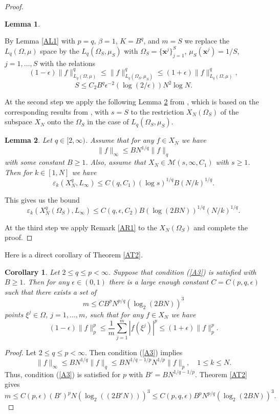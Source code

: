 \documentclass[12pt]{article}
\def \cM{\mathcal M}
\def \ep{\epsilon}
\def \e{\varepsilon}
\def\bx{\mathbf x}
\newtheorem{Lemma}{Lemma}[section]
\newtheorem{Corollary}{Corollary}[section]
\numberwithin{equation}{section}
\newcommand{\be}{\begin{equation}}
\newcommand{\ee}{\end{equation}}
\begin{document}
\begin{proof}
\begin{Lemma}
\end{Lemma}

By Lemma \ref{AL1} with $p=q$, $\beta =1$, $K=B^q$, and $m=S$ we replace the $L_q(\Omega,\mu)$ space 
by the $L_q(\Omega_S,\mu_S)$ with $\Omega_S= \{\bx^j\}_{j=1}^S$, $\mu_S(\bx^j)=1/S$, $j=1,\dots, S$ with the relations
\be\label{A6}
(1-\ep)\|f\|_{L_q(\Omega,\mu)}^q \le \|f\|_{L_q(\Omega_S,\mu_S)}^q \le (1+\ep)\|f\|_{L_q(\Omega,\mu)}^q,
\ee
\be\label{A7}
 S\le C_2B^q \ep^{-2}( \log( 2/\ep)) N^{2}\log N.
\ee

At the second step we apply the following Lemma \ref{AL2} from \cite{VT180}, which is based on the corresponding results from \cite{Kos}, with $s=S$ to the restriction $X_N(\Omega_S)$ of the 
subspace $X_N$ onto the $\Omega_S$ in the case of $L_q(\Omega_S,\mu_S)$. 

\begin{Lemma}\label{AL2} Let $q\in [2,\infty)$. Assume that for any $f\in X_N$ we have
\be\label{A8}
\|f\|_\infty \le BN^{1/q}\|f\|_q
\ee
with some constant $B\ge 1$. Also, assume that $X_N \in \cM(s,\infty,C_1)$ with $s\ge 1$.
Then for $k\in [1,N]$ we have  
\be\label{A9}
\e_k(X_N^q, L_\infty) \le C(q,C_1)(\log s)^{1/q} B(N/k)^{1/q} .
\ee
\end{Lemma}

This gives us the bound
\be\label{A10}
\e_k(X_N^q(\Omega_S), L_\infty) \le C(q,\ep,C_2)B (\log (2BN))^{1/q} (N/k)^{1/q} .
\ee

At the third step we apply Remark \ref{AR1} to the $X_N(\Omega_S)$ and complete the proof.

\end{proof}

Here  is a direct corollary of Theorem \ref{AT2}.

\begin{Corollary}\label{AC2} Let $2\le q \le p<\infty$. Suppose that condition (\ref{A3}) is satisfied
with $B\ge 1$. Then for any $\ep\in(0,1)$ there is a large enough constant $C=C(p,q,\ep)$ such that there exists a set of
\be\label{m}
m \le C B^{p}N^{p/q}(\log_2(2BN))^3 
\ee
 points $\xi^j\in \Omega$, $j=1,\dots,m$,   such that for any $f\in X_N$
we have
$$
(1-\ep)\|f\|_p^p \le \frac{1}{m}\sum_{j=1}^m |f(\xi^j)|^p \le (1+\ep)\|f\|_p^p.
$$
\end{Corollary}
\begin{proof} 
  Let $2\le q\le p <\infty$. Then condition (\ref{A3})
implies
\be\label{A11}
\|f\|_\infty\le B N^{1/q}\|f\|_q \le  BN^{1/q-1/p} N^{1/p}\|f\|_p, \quad 1\leq k\le N.
\ee
Thus, condition (\ref{A3}) is satisfied for $p$ with $B'=BN^{1/q-1/p}$. Theorem \ref{AT2} gives
$$
m \le C(p,\ep)(B')^{p}N(\log_2((2B'N)))^3 \le C(p, q,\ep)B^{p}N^{p/q}(\log_2(2BN) )^3.
$$
\end{proof}
\end{document}
